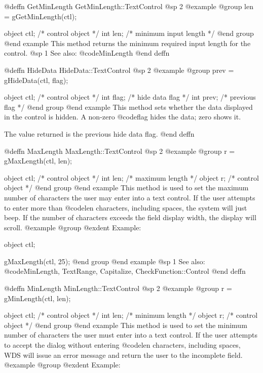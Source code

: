 @deffn {GetMinLength} GetMinLength::TextControl
@sp 2
@example
@group
len = gGetMinLength(ctl);

object  ctl;   /*  control object        */
int     len;   /*  minimum input length  */
@end group
@end example
This method returns the minimum required input length for the control.
@sp 1
See also:  @code{MinLength}
@end deffn



@deffn {HideData} HideData::TextControl
@sp 2
@example
@group
prev = gHideData(ctl, flag);

object  ctl;    /*  control object  */
int     flag;   /*  hide data flag  */
int     prev;   /*  previous flag   */
@end group
@end example
This method sets whether the data displayed in the control is hidden.
A non-zero @code{flag} hides the data; zero shows it.

The value returned is the previous hide data flag.
@end deffn













@deffn {MaxLength} MaxLength::TextControl
@sp 2
@example
@group
r = gMaxLength(ctl, len);

object  ctl;   /*  control object  */
int     len;   /*  maximum length  */
object  r;     /*  control object  */
@end group
@end example
This method is used to set the maximum number of characters the user may
enter into a text control.  If the user attempts to enter more than
@code{len} characters, including spaces, the system will just beep.  If
the number of characters exceeds the field display width, the display
will scroll.
@example
@group
@exdent Example:

object  ctl;

gMaxLength(ctl, 25);
@end group
@end example
@sp 1
See also:  @code{MinLength, TextRange, Capitalize, CheckFunction::Control}
@end deffn












@deffn {MinLength} MinLength::TextControl
@sp 2
@example
@group
r = gMinLength(ctl, len);

object  ctl;   /*  control object  */
int     len;   /*  minimum length  */
object  r;     /*  control object  */
@end group
@end example
This method is used to set the minimum number of characters the user must
enter into a text control.  If the user attempts to accept the dialog
without entering @code{len} characters, including spaces, WDS will
issue an error message and return the user to the incomplete field.
@example
@group
@exdent Example:

